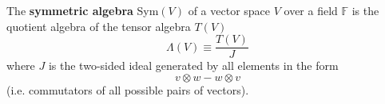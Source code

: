   \begin{definition}
    The \textbf{symmetric algebra} Sym$(V)$ of a vector space $V$ over a field $\mathbb{F}$ is the quotient algebra of the tensor algebra $T(V)$ 
    \begin{equation}
      \Lambda(V) \equiv \frac{T(V)}{J}
    \end{equation}
    where $J$ is the two-sided ideal generated by all elements in the form 
    \begin{equation}
      v \otimes w - w \otimes v
    \end{equation}
    (i.e. commutators of all possible pairs of vectors). 
  \end{definition}


